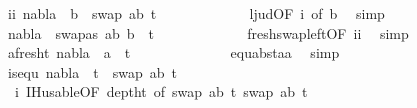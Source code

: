 \begin{isabellebody}
\ ii{\isacharcolon}{\kern0pt}\ {\isachardoublequoteopen}nabla\ {\isasymturnstile}\ b\ {\isasymsharp}\ swap\ {\isacharbrackleft}{\kern0pt}{\isacharparenleft}{\kern0pt}a{\isacharcomma}{\kern0pt}b{\isacharparenright}{\kern0pt}{\isacharbrackright}{\kern0pt}\ t{}{\isacharprime}{\kern0pt}{\isachardoublequoteclose}\isanewline
\ \ \ \ \ \ \ \ \ \ \ \isamarkupfalse%
\ l{}{\isacharunderscore}{\kern0pt}jud{\isacharbrackleft}{\kern0pt}OF\ i{\isacharcomma}{\kern0pt}\ of\ b{\isacharbrackright}{\kern0pt}\ \isamarkupfalse%
\ simp\isanewline
\ \ \ \ \ \ \ \ \ \isamarkupfalse%
\ {\isachardoublequoteopen}nabla\ {\isasymturnstile}\ swapas\ {\isacharbrackleft}{\kern0pt}{\isacharparenleft}{\kern0pt}a{\isacharcomma}{\kern0pt}b{\isacharparenright}{\kern0pt}{\isacharbrackright}{\kern0pt}\ b\ {\isasymsharp}\ t{}{\isacharprime}{\kern0pt}{\isachardoublequoteclose}\isanewline
\ \ \ \ \ \ \ \ \ \ \ \isamarkupfalse%
\ fresh{\isacharunderscore}{\kern0pt}swap{\isacharunderscore}{\kern0pt}left{\isacharbrackleft}{\kern0pt}OF\ ii{\isacharbrackright}{\kern0pt}\ \isamarkupfalse%
\ simp\isanewline
\ \ \ \ \ \ \ \ \ \isamarkupfalse%
\ \isamarkupfalse%
\ a{\isacharunderscore}{\kern0pt}fresh{\isacharunderscore}{\kern0pt}t{}{\isacharcolon}{\kern0pt}\ {\isachardoublequoteopen}nabla\ {\isasymturnstile}\ a\ {\isasymsharp}\ t{}{\isacharprime}{\kern0pt}{\isachardoublequoteclose}\isanewline
\ \ \ \ \ \ \ \ \ \ \ \isamarkupfalse%
\ {}{\isacharparenleft}{\kern0pt}{}{\isacharcomma}{\kern0pt}{}{\isacharparenright}{\kern0pt}\ equ{\isacharunderscore}{\kern0pt}abst{\isacharunderscore}{\kern0pt}aa{\isacharparenleft}{\kern0pt}{}{\isacharparenright}{\kern0pt}\ \isamarkupfalse%
\ simp\isanewline
\isanewline
\ \ \ \ \ \ \ \ \ \isamarkupfalse%
\ is{\isacharunderscore}{\kern0pt}equ{\isacharcolon}{\kern0pt}\ {\isachardoublequoteopen}nabla\ {\isasymturnstile}\ t{}{\isacharprime}{\kern0pt}\ {\isasymapprox}\ swap\ {\isacharbrackleft}{\kern0pt}{\isacharparenleft}{\kern0pt}a{\isacharcomma}{\kern0pt}b{\isacharparenright}{\kern0pt}{\isacharbrackright}{\kern0pt}\ t{}{\isacharprime}{\kern0pt}{\isachardoublequoteclose}\isanewline
\ \ \ \ \ \ \ \ \ \ \ \isamarkupfalse%
\ {}\ i\ IH{\isacharunderscore}{\kern0pt}usable{\isacharbrackleft}{\kern0pt}OF\ deptht{}{\isacharcomma}{\kern0pt}\ of\ {\isacartoucheopen}swap\ {\isacharbrackleft}{\kern0pt}{\isacharparenleft}{\kern0pt}a{\isacharcomma}{\kern0pt}b{\isacharparenright}{\kern0pt}{\isacharbrackright}{\kern0pt}\ t{}{\isacharprime}{\kern0pt}{\isacartoucheclose}\ {\isacartoucheopen}swap\ {\isacharbrackleft}{\kern0pt}{\isacharparenleft}{\kern0pt}a{\isacharcomma}{\kern0pt}b{\isacharparenright}{\kern0pt}{\isacharbrackright}{\kern0pt}\ t{}{\isacharprime}{\kern0pt}{\isacartoucheclose}{\isacharbrackright}{\kern0pt}\isanewline

\end{isabellebody}

